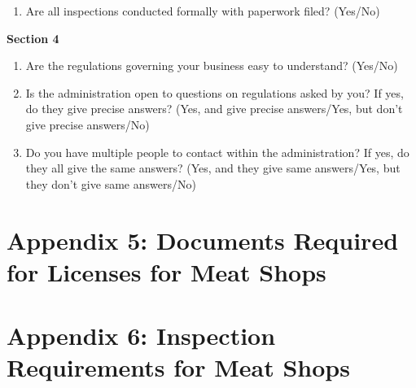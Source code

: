 \documentclass[a4paper, 12pt]{article}
\begin{document}
\begin{mdframed}[backgroundcolor=gray!20]
\begin{enumerate}[noitemsep]
\item Are all inspections conducted formally with paperwork filed? (Yes/No)
\end{enumerate}
\textbf {Section 4}
\begin{enumerate}[noitemsep]
\item Are the regulations governing your business easy to understand? (Yes/No)
\item Is the administration open to questions on regulations asked by you? If yes, do they give precise answers? (Yes, and give precise answers/Yes, but don’t give precise answers/No)
\item Do you have multiple people to contact within the administration? If yes, do they all give the same answers? (Yes, and they give same answers/Yes, but they don’t give same 
answers/No)
\end{enumerate} 
\end{mdframed}

\newpage
\section*{Appendix 5: Documents Required for Licenses for Meat Shops}

\newpage
\section*{Appendix 6: Inspection Requirements for Meat Shops}
\end{document}
